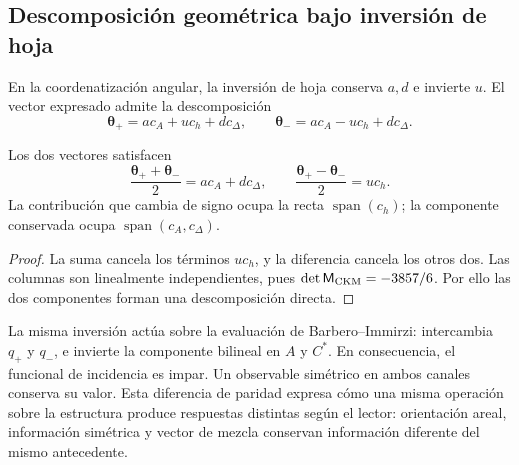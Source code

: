 \subsection{Descomposición geométrica bajo inversión de hoja}
\label{sec:ii09-descomposicion-paridad}

En la coordenatización angular, la inversión de hoja conserva \(a,d\) e
invierte \(u\). El vector expresado admite la descomposición
\[
 \boldsymbol\theta_+=a c_A+u c_h+d c_\Delta,
 \qquad
 \boldsymbol\theta_-=a c_A-u c_h+d c_\Delta.
\]
\begin{proposition}
\label{prop:ii09-paridad-angular}
Los dos vectores satisfacen
\[
 \frac{\boldsymbol\theta_++\boldsymbol\theta_-}{2}
       =a c_A+d c_\Delta,\qquad
 \frac{\boldsymbol\theta_+-\boldsymbol\theta_-}{2}=u c_h.
\]
La contribución que cambia de signo ocupa la recta
\(\operatorname{span}(c_h)\); la componente conservada ocupa
\(\operatorname{span}(c_A,c_\Delta)\).
\end{proposition}
\begin{proof}
La suma cancela los términos \(u c_h\), y la diferencia cancela
los otros dos. Las columnas son linealmente independientes, pues
\(\det\mathsf M_{\rm CKM}=-3857/6\). Por ello las dos
componentes forman una descomposición directa.
\end{proof}

La misma inversión actúa sobre la evaluación de Barbero--Immirzi:
intercambia \(q_+\) y \(q_-\), e invierte la componente bilineal
en \(A\) y \(C^*\). En consecuencia, el funcional de incidencia
es impar. Un observable simétrico en ambos canales conserva su
valor. Esta diferencia de paridad expresa cómo una misma
operación sobre la estructura produce respuestas distintas según
el lector: orientación areal, información simétrica y vector de
mezcla conservan información diferente del mismo antecedente.
